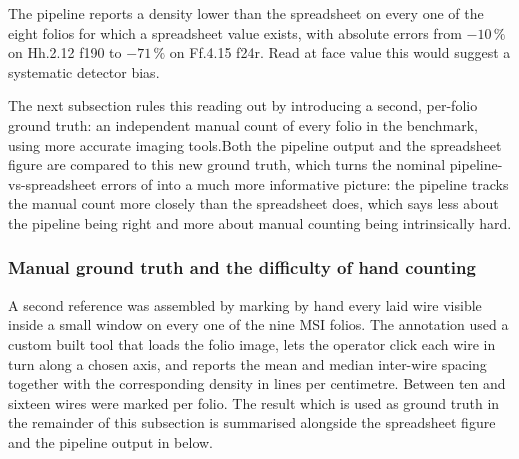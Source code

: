 The pipeline reports a density lower than the spreadsheet on
every one of the eight folios for which a spreadsheet value
exists, with absolute errors from $-10\,\%$ on Hh.2.12 f190 to
$-71\,\%$ on Ff.4.15 f24r. Read at face value this would suggest
a systematic detector bias.

The next subsection rules this reading out by introducing a
second, per-folio ground truth: an independent manual count of
every folio in the benchmark, using more accurate imaging tools.Both the pipeline
output and the spreadsheet figure are compared to this new ground truth, which 
turns the nominal pipeline-vs-spreadsheet errors of
 into a much more informative picture:
the pipeline tracks the manual count more closely than
the spreadsheet does, which says less about the pipeline being
right and more about manual counting being intrinsically hard.


\subsubsection{Manual ground truth and the difficulty of hand counting}
\label{sec:benchmark:msi:manual_gt}

A second reference was assembled by marking by hand
every laid wire visible inside a small window on every one of the
nine MSI folios. The annotation used a custom built tool that
loads the folio image, lets the operator click each wire in turn
along a chosen axis, and reports the mean and median inter-wire
spacing together with the corresponding density in lines per
centimetre. Between ten and sixteen wires were marked per folio.
The result which is used as ground truth in the remainder of this
subsection is summarised alongside the spreadsheet figure and
the pipeline output in  below.

